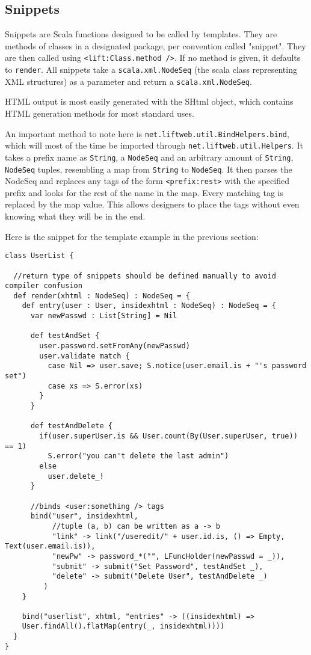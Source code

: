 \subsection{Snippets}

Snippets are Scala functions designed to be called by templates. They are methods of classes in a designated package, per convention called "snippet". They are then called using \lstinline!<lift:Class.method />!. If no method is given, it defaults to \lstinline!render!. All snippets take a \lstinline!scala.xml.NodeSeq! (the scala class representing XML structures) as a parameter and return a \lstinline!scala.xml.NodeSeq!.

HTML output is most easily generated with the SHtml object, which contains HTML generation methods for most standard uses.

An important method to note here is \lstinline!net.liftweb.util.BindHelpers.bind!, which will most of the time be imported through \lstinline!net.liftweb.util.Helpers!. It takes a prefix name as \lstinline!String!, a \lstinline!NodeSeq! and an arbitrary amount of \lstinline!String!, \lstinline!NodeSeq! tuples, resembling a map from \lstinline!String! to \lstinline!NodeSeq!. It then parses the NodeSeq and replaces any tags of the form \lstinline!<prefix:rest>! with the specified prefix and looks for the rest of the name in the map. Every matching tag is replaced by the map value. This allows designers to place the tags without even knowing what they will be in the end.

Here is the snippet for the template example in the previous section:
\begin{lstlisting}[caption=Lift Snippets: UserList.scala,label=lst:lift:snippets]
class UserList {

  //return type of snippets should be defined manually to avoid compiler confusion
  def render(xhtml : NodeSeq) : NodeSeq = {
    def entry(user : User, insidexhtml : NodeSeq) : NodeSeq = {
      var newPasswd : List[String] = Nil
      
      def testAndSet {
        user.password.setFromAny(newPasswd)
        user.validate match {
          case Nil => user.save; S.notice(user.email.is + "'s password set")
          case xs => S.error(xs)
        }
      }
      
      def testAndDelete {
        if(user.superUser.is && User.count(By(User.superUser, true)) == 1)
          S.error("you can't delete the last admin")
        else
          user.delete_!
      }
    
      //binds <user:something /> tags
      bind("user", insidexhtml,
           //tuple (a, b) can be written as a -> b
           "link" -> link("/useredit/" + user.id.is, () => Empty, Text(user.email.is)),
           "newPw" -> password_*("", LFuncHolder(newPasswd = _)),
           "submit" -> submit("Set Password", testAndSet _),
           "delete" -> submit("Delete User", testAndDelete _)
         )
    }
    
    bind("userlist", xhtml, "entries" -> ((insidexhtml) =>
    User.findAll().flatMap(entry(_, insidexhtml))))
  }
}
\end{lstlisting}


